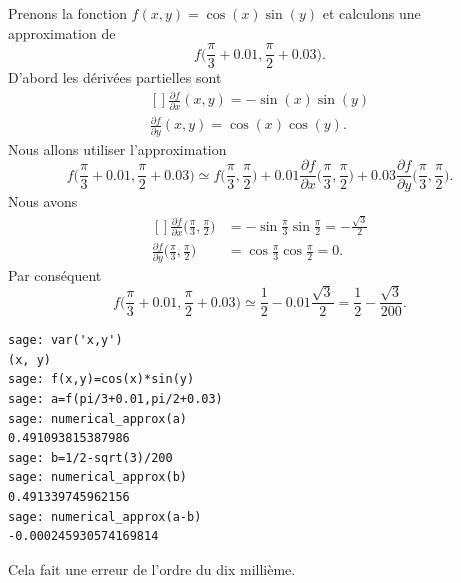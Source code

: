 \begin{example}
    Prenons la fonction $f(x,y)=\cos(x)\sin(y)$ et calculons une approximation de
    \begin{equation}
        f\big( \frac{ \pi }{ 3 }+0.01,\frac{ \pi }{ 2 }+0.03 \big).
    \end{equation}
    D'abord les dérivées partielles sont
    \begin{equation}
        \begin{aligned}[]
            \frac{ \partial f }{ \partial x }(x,y)=-\sin(x)\sin(y)\\
            \frac{ \partial f }{ \partial y }(x,y)=\cos(x)\cos(y).
        \end{aligned}
    \end{equation}
    Nous allons utiliser l'approximation
    \begin{equation}
        f\big( \frac{ \pi }{ 3 }+0.01,\frac{ \pi }{ 2 }+0.03 \big)\simeq f\big( \frac{ \pi }{ 3 },\frac{ \pi }{2} \big)+0.01\frac{ \partial f }{ \partial x }\big( \frac{ \pi }{ 3 },\frac{ \pi }{2} \big)+0.03\frac{ \partial f }{ \partial y }\big( \frac{ \pi }{ 3 },\frac{ \pi }{2} \big).
    \end{equation}
    Nous avons
    \begin{equation}
        \begin{aligned}[]
            \frac{ \partial f }{ \partial x }\big( \frac{ \pi }{ 3 },\frac{ \pi }{2} \big)&=-\sin\frac{ \pi }{ 3 }\sin\frac{ \pi }{ 2 }=-\frac{ \sqrt{3} }{2}\\
            \frac{ \partial f }{ \partial y }\big( \frac{ \pi }{ 3 },\frac{ \pi }{2} \big)&=\cos\frac{ \pi }{ 3 }\cos\frac{ \pi }{ 2 }=0.
        \end{aligned}
    \end{equation}
    Par conséquent
    \begin{equation}
        f\big( \frac{ \pi }{ 3 }+0.01,\frac{ \pi }{ 2 }+0.03 \big)\simeq \frac{ 1 }{2}-0.01\frac{ \sqrt{3} }{2}=\frac{ 1 }{2}-\frac{ \sqrt{3} }{ 200 }. 
    \end{equation}
    
    \begin{verbatim}
sage: var('x,y')
(x, y)
sage: f(x,y)=cos(x)*sin(y)
sage: a=f(pi/3+0.01,pi/2+0.03)
sage: numerical_approx(a)
0.491093815387986
sage: b=1/2-sqrt(3)/200
sage: numerical_approx(b)
0.491339745962156
sage: numerical_approx(a-b)
-0.000245930574169814
    \end{verbatim}
    Cela fait une erreur de l'ordre du dix millième. 
    
\end{example}

